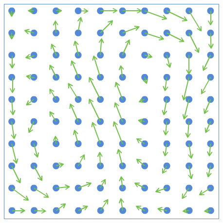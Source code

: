 \documentclass{beamer}\usetheme{Madrid} %
\begin{document}
\begin{frame}
\begin{columns}
\begin{center}
\end{center}
\begin{center}
\includegraphics[scale=0.23]{img/particles_velocity.png}
\end{center}
\end{columns}
\end{frame}
\end{document}
